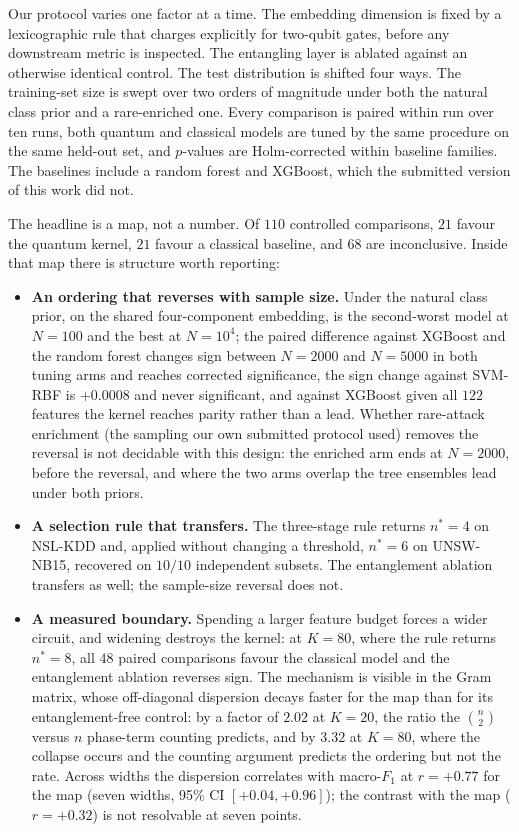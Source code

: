 \begin{revbody}
Our protocol varies one factor at a time. The embedding dimension is fixed by a
lexicographic rule that charges explicitly for two-qubit gates, before any
downstream metric is inspected. The entangling layer is ablated against an
otherwise identical control. The test distribution is shifted four ways. The
training-set size is swept over two orders of magnitude under both the natural
class prior and a rare-enriched one. Every comparison is paired within run over
ten runs, both quantum and classical models are tuned by the same procedure on
the same held-out set, and $p$-values are Holm-corrected within baseline
families. The baselines include a random forest and XGBoost, which the submitted
version of this work did not.

The headline is a map, not a number. Of $110$ controlled comparisons, $21$
favour the quantum kernel, $21$ favour a classical baseline, and $68$ are
inconclusive. Inside that map there is structure worth reporting:

\begin{itemize}
  \item \textbf{An ordering that reverses with sample size.} Under the natural
    class prior, on the shared four-component embedding, \QSVM{} is the
    second-worst model at $N=100$ and the best at $N=10^{4}$; the paired
    difference against XGBoost and the random forest changes sign between
    $N=2000$ and $N=5000$ in both tuning arms and reaches corrected
    significance, the sign change against SVM-RBF is $+0.0008$ and never
    significant, and against XGBoost given all $122$ features the kernel
    reaches parity rather than a lead. Whether rare-attack enrichment (the
    sampling our own submitted protocol used) removes the reversal is not
    decidable with this design: the enriched arm ends at $N=2000$, before the
    reversal, and where the two arms overlap the tree ensembles lead under
    both priors.
  \item \textbf{A selection rule that transfers.} The three-stage rule returns
    $n^{\ast}=4$ on NSL-KDD and, applied without changing a threshold,
    $n^{\ast}=6$ on UNSW-NB15, recovered on $10/10$ independent subsets. The
    entanglement ablation transfers as well; the sample-size reversal does not.
  \item \textbf{A measured boundary.} Spending a larger feature budget forces a
    wider circuit, and widening destroys the kernel: at $K=80$, where the rule
    returns $n^{\ast}=8$, all $48$ paired comparisons favour the classical
    model and the entanglement ablation reverses sign. The mechanism is visible
    in the Gram matrix, whose off-diagonal dispersion decays faster for the
    \ZZ{} map than for its entanglement-free control: by a factor of $2.02$ at
    $K=20$, the ratio the $\binom{n}{2}$ versus $n$ phase-term counting
    predicts, and by $3.32$ at $K=80$, where the collapse occurs and the
    counting argument predicts the ordering but not the rate. Across widths the
    dispersion correlates with macro-$F_{1}$ at $r=+0.77$ for the \ZZ{} map
    (seven widths, 95\% CI $[+0.04,+0.96]$); the contrast with the \Zmap{}
    map ($r=+0.32$) is not resolvable at seven points.
\end{itemize}


\end{revbody}
